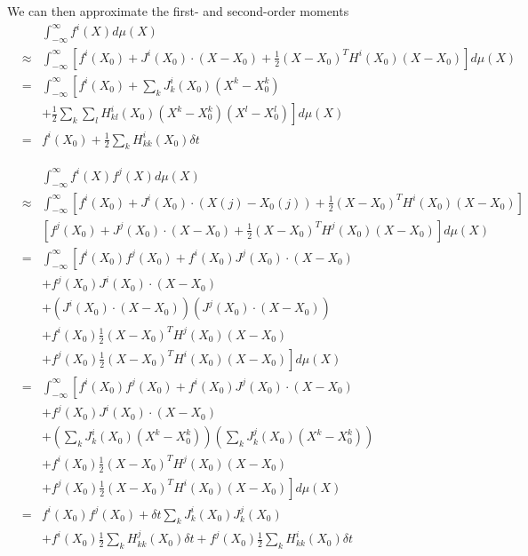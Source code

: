 \documentclass[12pt]{article}
\begin{document}
We can then approximate the first- and second-order moments 
\begin{eqnarray}
&&\int_{-\infty}^{\infty} f^i(X) d\mu(X) \\
&\approx &
 \int_{-\infty}^{\infty} \left[ f^i(X_0) + J^i(X_0) \cdot (X-X_0) +\frac{1}{2} (X-X_0)^T H^i(X_0) (X-X_0) \right] d\mu(X) \\
&=&\int_{-\infty}^{\infty} \left[ f^i(X_0) + \sum_k J^i_k(X_0) (X^k-X_0^k)  \right. \\
&& \left. + \frac{1}{2} \sum_k \sum_l H^i_{kl}(X_0) (X^k-X_0^k) (X^l-X_0^l) \right] d\mu(X) \\
&=& f^i(X_0) + \frac{1}{2} \sum_k H^i_{kk}(X_0) \delta t
\end{eqnarray}

\begin{eqnarray}
&&\int_{-\infty}^{\infty} f^i(X) f^j(X) d\mu(X) \\
&\approx &
\int_{-\infty}^{\infty} \left[ f^i(X_0) + J^i(X_0) \cdot (X(j)-X_0(j)) +\frac{1}{2} (X-X_0)^T H^i(X_0) (X-X_0) \right] \\
&& \left[ f^j(X_0) + J^j(X_0) \cdot (X-X_0) +\frac{1}{2} (X-X_0)^T H^j(X_0) (X-X_0) \right] d\mu(X) \\
&=& \int_{-\infty}^{\infty} \left[ f^i(X_0) f^j(X_0) + f^i(X_0) J^j(X_0) \cdot (X-X_0) \right. \\
&& + f^j(X_0) J^i(X_0) \cdot (X-X_0) \\
&& + \left( J^i(X_0) \cdot (X-X_0) \right) \left( J^j(X_0) \cdot (X-X_0) \right) \\
&& + f^i(X_0) \frac{1}{2} (X-X_0)^T H^j(X_0) (X-X_0) \\
&& \left. + f^j(X_0) \frac{1}{2} (X-X_0)^T H^i(X_0) (X-X_0) \right] d \mu(X) \\
&=& \int_{-\infty}^{\infty} \left[ f^i(X_0) f^j(X_0) + f^i(X_0) J^j(X_0) \cdot (X-X_0) \right. \\
&& + f^j(X_0) J^i(X_0) \cdot (X-X_0) \\
&& + \left( \sum_k J_k^i(X_0) (X^k - X_0^k) \right) \left( \sum_k J_k^j(X_0) (X^k - X_0^k) \right) \\
&& + f^i(X_0) \frac{1}{2} (X-X_0)^T H^j(X_0) (X-X_0) \\
&& \left. + f^j(X_0) \frac{1}{2} (X-X_0)^T H^i(X_0) (X-X_0) \right] d \mu(X)\\
&=& f^i(X_0) f^j(X_0) + \delta t \sum_k J_k^i(X_0) J_k^j(X_0)  \\
&& + f^i(X_0) \frac{1}{2} \sum_k H^j_{kk}(X_0) \delta t + f^j(X_0)\frac{1}{2} \sum_k H^i_{kk}(X_0) \delta t
\end{eqnarray}
\end{document}
